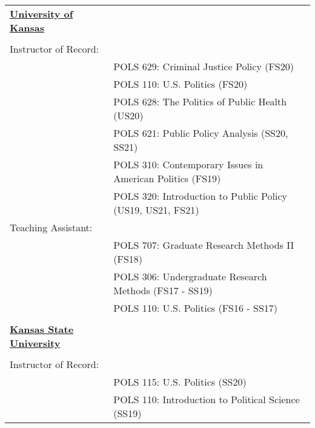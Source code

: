 \documentclass[margin,line,pifont,palatino,courier]{res}
\begin{document}
\begin{resume}
\begin{tabular}{ll}
  \textbf{\underline{University of Kansas}} & \tabularnewline
  & \tabularnewline
    Instructor of Record: & \tabularnewline
  & POLS 629: Criminal Justice Policy (FS20)\tabularnewline
  & POLS 110: U.S. Politics (FS20)\tabularnewline
  & POLS 628: The Politics of Public Health (US20)\tabularnewline
  & POLS 621: Public Policy Analysis (SS20, SS21)\tabularnewline
  & POLS 310: Contemporary Issues in American Politics (FS19)\tabularnewline
  & POLS 320: Introduction to Public Policy (US19, US21, FS21)\tabularnewline
    Teaching Assistant: & \tabularnewline
  & POLS 707: Graduate Research Methods II (FS18)\tabularnewline
  & POLS 306: Undergraduate Research Methods (FS17 - SS19)\tabularnewline
  & POLS 110: U.S. Politics (FS16 - SS17)\tabularnewline
  & \tabularnewline
    \textbf{\underline{Kansas State University}} & \tabularnewline
  & \tabularnewline
    Instructor of Record: & \tabularnewline
  & POLS 115: U.S. Politics (SS20)\tabularnewline
  & POLS 110: Introduction to Political Science (SS19)\tabularnewline
\end{tabular}


\end{resume}
\end{document}
